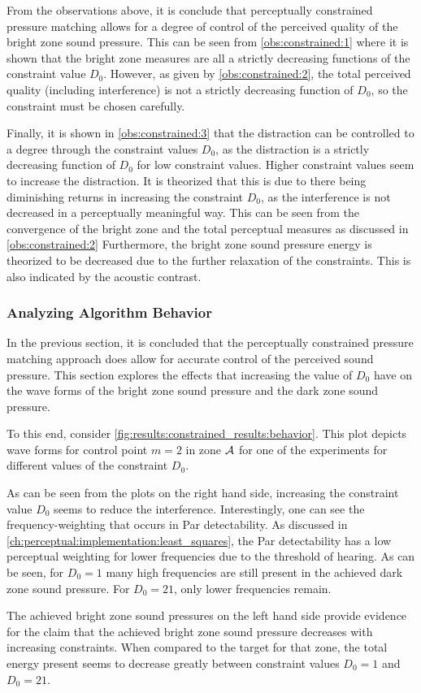 From the observations above, it is conclude that perceptually constrained pressure matching allows
for a degree of control of the perceived quality of the bright zone sound pressure.
This can be seen from \autoref{obs:constrained:1} where it is shown that the bright zone measures are 
all a strictly decreasing functions of the constraint value $D_0$. 
However, as given by \autoref{obs:constrained:2}, the total perceived quality (including interference) is 
not a strictly decreasing function of $D_0$, so the constraint must be chosen carefully.

Finally, it is shown in \autoref{obs:constrained:3} that the distraction can be controlled to a degree through 
the constraint values $D_0$, as the distraction is a strictly decreasing function of $D_0$ for low constraint values. 
Higher constraint values seem to increase the distraction.
It is theorized that this is due to there being diminishing returns in increasing the constraint $D_0$, as the 
interference is not decreased in a perceptually meaningful way.
This can be seen from the convergence of the bright zone and the total perceptual measures as discussed in 
\autoref{obs:constrained:2}
Furthermore, the bright zone sound pressure energy is theorized to be decreased due to the further 
relaxation of the constraints.
This is also indicated by the acoustic contrast.


\subsubsection*{Analyzing Algorithm Behavior}

In the previous section, it is concluded that the perceptually constrained pressure matching approach does 
allow for accurate control of the perceived sound pressure.
This section explores the effects that increasing the value of $D_0$ have on the wave forms of the 
bright zone sound pressure and the dark zone sound pressure.

To this end, consider \autoref{fig:results:constrained_results:behavior}.
This plot depicts wave forms for control point $m=2$ in zone $\mathcal{A}$ for one of the experiments for different values 
of the constraint $D_0$.

As can be seen from the plots on the right hand side,
increasing the constraint value $D_0$ seems to reduce the interference.
Interestingly, one can see the frequency-weighting that occurs in Par detectability.
As discussed in \autoref{ch:perceptual:implementation:least_squares}, the Par detectability has a low perceptual weighting 
for lower frequencies due to the threshold of hearing.
As can be seen, for $D_0 = 1$ many high frequencies are still present in the achieved dark zone sound pressure.
For $D_0=21$, only lower frequencies remain. 

The achieved bright zone sound pressures on the left hand side provide evidence for the claim that the 
achieved bright zone sound pressure decreases with increasing constraints.
When compared to the target for that zone, the total energy present seems to decrease greatly between 
constraint values $D_0=1$ and $D_0=21$.  
